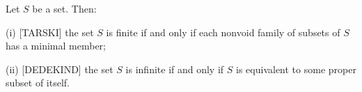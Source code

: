 Let $S$ be a set. Then:

(i) [TARSKI] the set $S$ is finite if and only if each nonvoid family of subsets of $S$ has a minimal member;

(ii) [DEDEKIND] the set $S$ is infinite if and only if $S$ is equivalent to some proper subset of itself.